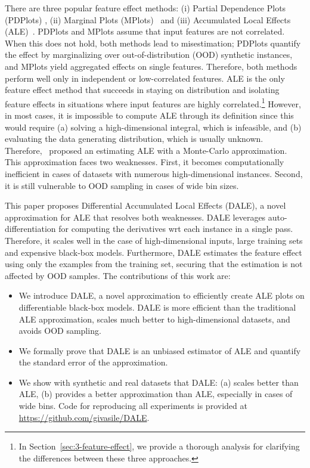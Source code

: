 \documentclass[wcp]{jmlr}
\begin{document}
There are three popular feature effect methods: (i) Partial Dependence Plots (PDPlots) \citep{Friedman2001}, (ii) Marginal Plots (MPlots)~\citep{Apley2020} and (iii) Accumulated Local Effects (ALE)~\citep{Apley2020}. PDPlots and MPlots assume that input features are not correlated. When this does not hold, both methods lead to misestimation; PDPlots quantify the effect by marginalizing over out-of-distribution (OOD) synthetic instances, and MPlots yield aggregated effects on single features. Therefore, both methods perform well only in independent or low-correlated features. ALE is the only feature effect method that succeeds in staying on distribution and isolating feature effects in situations where input features are highly correlated.\footnote{In Section~\ref{sec:3-feature-effect}, we provide a thorough analysis for clarifying the differences between these three approaches.} However, in most cases, it is impossible to compute ALE through its definition since this would require (a) solving a high-dimensional integral, which is infeasible, and (b) evaluating the data generating distribution, which is usually unknown. Therefore,~\cite{Apley2020} proposed an estimating ALE with a Monte-Carlo approximation. This approximation faces two weaknesses. First, it becomes computationally inefficient in cases of datasets with numerous high-dimensional instances. Second, it is still vulnerable to OOD sampling in cases of wide bin sizes.

This paper proposes Differential Accumulated Local Effects (DALE), a novel approximation for ALE that resolves both weaknesses. DALE leverages auto-differentiation for computing the derivatives wrt each instance in a single pass. Therefore, it scales well in the case of high-dimensional inputs, large training sets and expensive black-box models. Furthermore, DALE estimates the feature effect using only the examples from the training set, securing that the estimation is not affected by OOD samples.
%
The contributions of this work are:
%
\begin{itemize}
\item We introduce DALE, a novel approximation to efficiently create ALE plots on differentiable black-box models. DALE is more efficient than the traditional ALE approximation, scales much better to high-dimensional datasets, and avoids OOD sampling.
\item We formally prove that DALE is an unbiased estimator of ALE and quantify the standard error of the approximation.
\item We show with synthetic and real datasets that DALE: (a) scales
  better than ALE, (b) provides a better approximation than ALE,
  especially in cases of wide bins. Code for reproducing all
  experiments is provided at \href{https://github.com/givasile/DALE}{https://github.com/givasile/DALE}.
\end{itemize}
\end{document}
